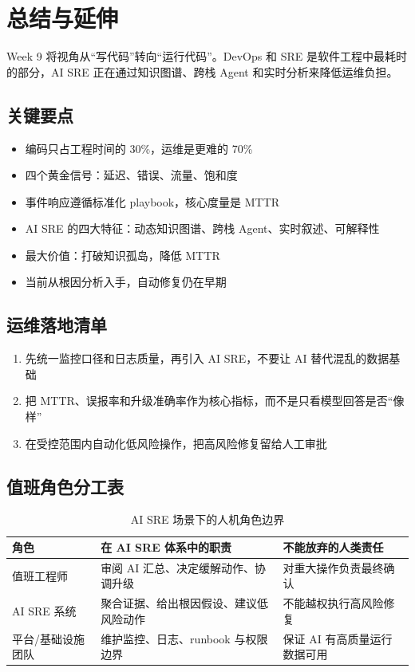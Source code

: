 \section{总结与延伸}

Week 9 将视角从``写代码''转向``运行代码''。DevOps 和 SRE 是软件工程中最耗时的部分，AI SRE 正在通过知识图谱、跨栈 Agent 和实时分析来降低运维负担。

\subsection{关键要点}

\begin{itemize}
    \item 编码只占工程时间的 30\%，运维是更难的 70\%
    \item 四个黄金信号：延迟、错误、流量、饱和度
    \item 事件响应遵循标准化 playbook，核心度量是 MTTR
    \item AI SRE 的四大特征：动态知识图谱、跨栈 Agent、实时叙述、可解释性
    \item 最大价值：打破知识孤岛，降低 MTTR
    \item 当前从根因分析入手，自动修复仍在早期
\end{itemize}

\subsection{运维落地清单}

\begin{enumerate}
    \item 先统一监控口径和日志质量，再引入 AI SRE，不要让 AI 替代混乱的数据基础
    \item 把 MTTR、误报率和升级准确率作为核心指标，而不是只看模型回答是否“像样”
    \item 在受控范围内自动化低风险操作，把高风险修复留给人工审批
\end{enumerate}

\subsection{值班角色分工表}

\begin{table}[H]
\centering
\begin{tabular}{p{} p{} p{}}
\toprule
角色 & 在 AI SRE 体系中的职责 & 不能放弃的人类责任 \\
\midrule
值班工程师 & 审阅 AI 汇总、决定缓解动作、协调升级 & 对重大操作负责最终确认 \\
AI SRE 系统 & 聚合证据、给出根因假设、建议低风险动作 & 不能越权执行高风险修复 \\
平台/基础设施团队 & 维护监控、日志、runbook 与权限边界 & 保证 AI 有高质量运行数据可用 \\
\bottomrule
\end{tabular}
\caption{AI SRE 场景下的人机角色边界}
\end{table}

